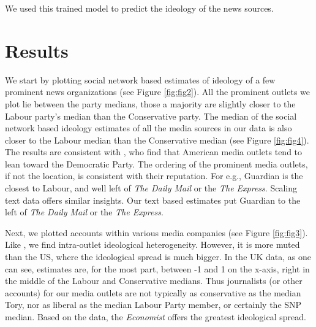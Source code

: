 \documentclass[12pt, letterpaper]{article}
\begin{document}
\let\center\empty
\let\endcenter\relax
\begin{center}

\end{center}
We used this trained model to predict the ideology of the news sources. 

\section*{Results}

We start by plotting social network based estimates of ideology of a few prominent news organizations (see Figure \ref{fig:fig2}). All the prominent outlets we plot lie between the party medians, those a majority are slightly closer to the Labour party's median than the Conservative party. The median of the social network based ideology estimates of all the media sources in our data is also closer to the Labour median than the Conservative median (see Figure \ref{fig:fig4}). The results are consistent with \citet{barbera2016}, who find that American media outlets tend to lean toward the Democratic Party. The ordering of the prominent media outlets, if not the location, is consistent with their reputation. For e.g., Guardian is the closest to Labour, and well left of \emph{The Daily Mail} or the \emph{The Express}. Scaling text data offers similar insights. Our text based estimates put Guardian to the left of \emph{The Daily Mail} or the \emph{The Express}. 
 
Next, we plotted accounts within various media companies (see Figure \ref{fig:fig3}). Like \citet{barbera2016}, we find intra-outlet ideological heterogeneity. However, it is more muted than the US, where the ideological spread is much bigger. In the UK data, as one can see, estimates are, for the most part, between -1 and 1 on the x-axis, right in the middle of the Labour and Conservative medians. Thus journalists (or other accounts) for our media outlets are not typically as conservative as the median Tory, nor as liberal as the median Labour Party member, or certainly the SNP median.  Based on the data, the \emph{Economist} offers the greatest ideological spread. 
\end{document}
